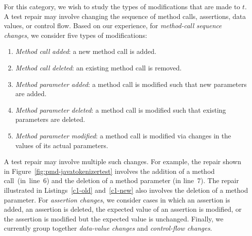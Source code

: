\documentclass[conference]{IEEEtran}
\def\denseitems{
  \itemsep1pt plus1pt minus1pt
  \parsep0pt plus0pt
  \parskip0pt\topsep0pt}
\begin{document}
\vspace*{-5pt}


For this category, we wish to study the types of modifications that
are made to $t$. A test repair may involve changing the sequence of
method calls, assertions, data values, or control flow. Based on our
experience, for \textit{method-call sequence changes}, we consider
five types of modifications:

\begin{enumerate}
\denseitems

\item \textit{Method call added}: a new method call is added.

\item \textit{Method call deleted}: an existing method call is
  removed.

\item \textit{Method parameter added}: a method call is modified such
  that new parameters are added.

\item \textit{Method parameter deleted}: a method call is modified
  such that existing parameters are deleted.

\item \textit{Method parameter modified}: a method call is modified
  via changes in the values of its actual parameters.

\end{enumerate}

A test repair may involve multiple such changes. For example, the
repair shown in Figure~\ref{fig:pmd-javatokenizertest} involves the
addition of a method call~(in~line~6) and the deletion of a method
parameter (in line~7). The repair illustrated in Listings~\ref{c1-old}
and~\ref{c1-new} also involves the deletion of a method parameter.
%
For \textit{assertion changes}, we consider cases in which an
assertion is added, an assertion is deleted, the expected value of an
assertion is modified, or the assertion is modified but the expected
value is unchanged.
%
Finally, we currently group together \textit{data-value changes} and
\textit{control-flow changes}.
\end{document}
